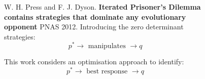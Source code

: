 \documentclass[usenames,dvipsnames,t]{beamer}
\begin{document}
\begin{columns}
    \begin{column}{.2\linewidth}
        \vspace{-.9cm}
        \begin{center}
            
        \end{center}
    \end{column}
    \begin{column}{.1\linewidth}
        \vspace{3.5cm}

            
    \end{column}
    \begin{column}{.25\linewidth}
        \vspace{1.5cm}

        \hspace{-2cm} 
    \end{column}
    \begin{column}{.1\linewidth}
        \vspace{1.5cm}

        
    \end{column}
    \begin{column}{.35\linewidth}
        \vspace{1cm}

        \small{
            W. H. Press and F. J. Dyson. \textbf{Iterated Prisoner’s
            Dilemma contains strategies that dominate any evolutionary opponent}
            PNAS 2012. Introducing the zero determinant strategies:
            \[p ^ * \rightarrow \text{ manipulates } \rightarrow q\]
        }
        \vspace{1cm}

        \small{
        This work considers an optimisation approach to identify:
        \[ p ^ * \rightarrow \text{ best response } \rightarrow q\]
            }
    \end{column}
    \begin{column}{.2\linewidth}
    \end{column}
\end{columns}
\vspace{0.7cm}
\end{document}
